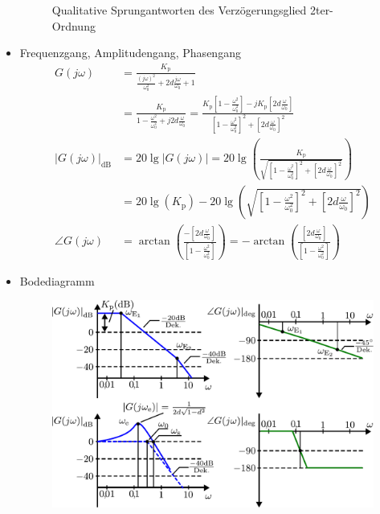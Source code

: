 \begin{itemize}
\begin{figure}[h]
		\caption{Qualitative Sprungantworten des Verzögerungsglied 2ter-Ordnung}
		\label{fig:pt2gliedsprung}
	\end{figure}
	\item Frequenzgang, Amplitudengang, Phasengang
	\begin{equation*}
	\begin{aligned}
	G(j\omega)&=\frac{K_{\text{p}}}{\frac{(j\omega)^{2}}{\omega_{0}^{2}}+2d\frac{j\omega}{\omega_{0}}+1}\\
	&=\frac{K_{\text{p}}}{1-\frac{\omega^{2}}{\omega_{0}^{2}}+j2d\frac{\omega}{\omega_{0}}}=\frac{K_{\text{p}}\left[1-\frac{\omega^{2}}{\omega_{0}^{2}}\right]-jK_{\text{p}}\left[2d\frac{\omega}{\omega_{0}}\right]}{\left[1-\frac{\omega^{2}}{\omega_{0}^{2}}\right]^{2}+\left[2d\frac{\omega}{\omega_{0}}\right]^{2}}\\
	|G(j\omega)|_{\text{dB}}&=20\lg|G(j\omega)|=20\lg\left(\frac{K_{\text{p}}}{\sqrt{\left[1-\frac{\omega^{2}}{\omega_{0}^{2}}\right]^{2}+\left[2d\frac{\omega}{\omega_{0}}\right]^{2}}}\right)\\
	&=20\lg\left(K_{\text{p}}\right)-20\lg\left(\sqrt{\left[1-\frac{\omega^{2}}{\omega_{0}^{2}}\right]^{2}+\left[2d\frac{\omega}{\omega_{0}}\right]^{2}}\right)\\
	\angle G(j\omega)&=\arctan\left(\frac{-\left[2d\frac{\omega}{\omega_{0}}\right]}{\left[1-\frac{\omega^{2}}{\omega_{0}^{2}}\right]}\right)=-\arctan\left(\frac{\left[2d\frac{\omega}{\omega_{0}}\right]}{\left[1-\frac{\omega^{2}}{\omega_{0}^{2}}\right]}\right)
	\end{aligned}
	\end{equation*}
	\item Bodediagramm
	\begin{figure}[h]
		\centering
		\includegraphics[width=0.9\linewidth]{Abbildungen/Modellbildung/PDF/PT2gliedBode.pdf}

\end{figure}
\end{itemize}
